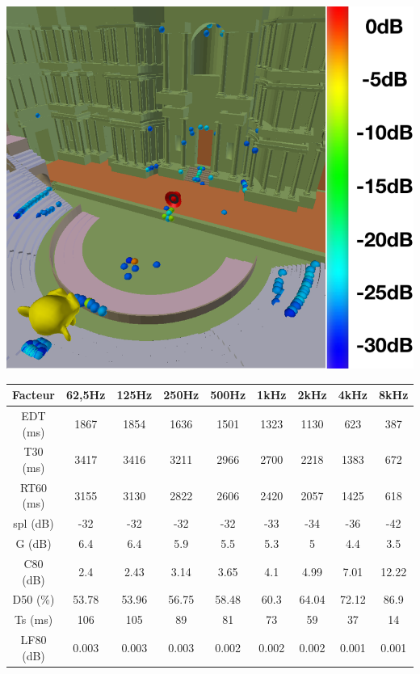 \begin{figureth}
\begin{subfigureth}{0.61\textwidth}
		\includegraphics[width=\linewidth]{images/SI30dB}
		\caption{Source-images projetées sur les parois du théâtre jusqu'à -30dB.}
		\label{SI30dB}
	\end{subfigureth}
\caption{Source-images dans le théâtre d'Orange dans sa configuration initiale pour 1 million de rayons.}	
\label{SITheatre30}
\end{figureth}


\begin{tableth}
 \begin{tabular}{| *{9}{c|}} 
 \hline 
 Facteur & 62,5Hz & 125Hz & 250Hz & 500Hz & 1kHz & 2kHz & 4kHz & 8kHz \\ 
 \hline 
 \hline 
\gls{EDT} (ms)& 1867& 1854& 1636& 1501& 1323& 1130& 623& 387 \\ 
 \hline 
\gls{T30} (ms)& 3417& 3416& 3211& 2966& 2700& 2218& 1383& 672 \\ 
 \hline 
\gls{RT60} (ms)& 3155& 3130& 2822& 2606& 2420& 2057& 1425& 618 \\ 
 \hline 
\gls{spl} (dB)& -32& -32& -32& -32& -33& -34& -36& -42 \\ 
 \hline 
\gls{G} (dB)& 6.4& 6.4& 5.9& 5.5& 5.3& 5& 4.4& 3.5 \\ 
 \hline 
\gls{C80} (dB)& 2.4& 2.43& 3.14& 3.65& 4.1& 4.99& 7.01& 12.22 \\ 
 \hline 
\gls{D50} (\%)& 53.78& 53.96& 56.75& 58.48& 60.3& 64.04& 72.12& 86.9 \\ 
 \hline 
\gls{Ts} (ms)& 106& 105& 89& 81& 73& 59& 37& 14 \\ 
 \hline 
\gls{LF80} (dB)& 0.003& 0.003& 0.003& 0.002& 0.002& 0.002& 0.001& 0.001 \\ 
 \hline 
\end{tabular} 
 \caption{Facteurs perceptifs pour une source en [0 ; 5.6 ; 42.8] et un auditeur en [0 ; -16.5 ; 42.8] et 1000000 rayons dans la configuration initiale.}
 \label{tab_fact_init} 
 \end{tableth}



